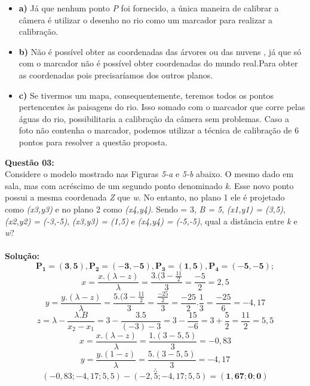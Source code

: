 \begin{itemize}
\item\textbf{a)}
Já que nenhum ponto \emph{P} foi fornecido, a única maneira de calibrar a câmera é utilizar o desenho no rio como um marcador para realizar a calibração.

\vspace{0.5cm}
\item\textbf{b)}
Não é possível obter as coordenadas das árvores ou das nuvens , já que só com o marcador não é possível obter coordenadas do mundo real.Para obter as coordenadas pois precisaríamos dos outros planos.

\vspace{0.5cm}
\item\textbf{c)}
Se tivermos um mapa, consequentemente, teremos todos os pontos pertencentes às paisagens do rio. Isso somado com o marcador que corre pelas águas do rio, possibilitaria a calibração da câmera sem problemas. Caso a foto não contenha o marcador, podemos utilizar a técnica de calibração de 6 pontos para resolver a questão proposta.
\end{itemize}

\vspace{0.5 cm}
\noindent\textbf{Questão 03:}\\
Considere o modelo mostrado nas Figuras \emph{5-a} e \emph{5-b} abaixo. O mesmo dado em sala, mas com acréscimo de um segundo ponto denominado \emph{k}. Esse novo ponto possui a mesma coordenada \emph{Z} que \emph{w}. No entanto, no plano 1 ele é projetado como \emph{(x3,y3)} e no plano 2 como \emph{(x4,y4)}. Sendo \textlambda = 3, \emph{B = 5}, \emph{(x1,y1) = (3,5)}, \emph{(x2,y2) = (-3,-5)}, \emph{(x3,y3) = (1,5)} e \emph{(x4,y4) = (-5,-5)}, qual a distância entre \emph{k} e \emph{w}?\\
\\
\noindent\textbf{Solução:}
\[ \mathbf{P_{1} = (3,5), P_{2} = (-3, -5), P_{3} = (1,5), P_{4} = (-5, -5)}; \]
\vspace{0.2 cm}
\[ x = \frac{x.(\lambda - z)}{\lambda} = \frac{3.(3 - \frac{11}{2}}{3} = \frac{-5}{2} = 2,5 \]
\[ y = \frac{y.(\lambda - z)}{\lambda} = \frac{5.(3-\frac{11}{2}}{3} = \frac{\frac{-25}{2}}{3} = \frac{-25}{2} . \frac{1}{3} = \frac{-25}{6} = -4,17 \]
\[ z = \lambda - \frac{\lambda . B}{x_{2}-x_{1}} = 3 - \frac{3.5}{(-3)-3} = 3 - \frac{15}{-6} = 3 + \frac{5}{2} = \frac{11}{2} = 5,5 \]
\[ x = \frac{x.(\lambda - z)}{\lambda} = \frac{1.(3 - 5,5)}{3} = -0,83 \]
\[ y = \frac{y.(1-z)}{\lambda} = \frac{5.(3 - 5,5)}{3} = -4,17 \]
\[ \therefore \]
\[(-0,83; -4,17; 5,5) - (-2,5; -4,17; 5,5) = \mathbf{(1,67; 0; 0)} \]

